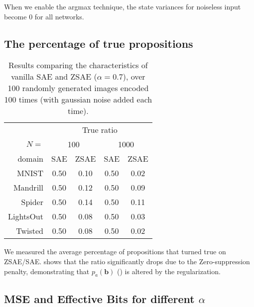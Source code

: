 \documentclass[10pt,letterpaper]{article}
\begin{document}
When we enable the argmax technique, the state variances for noiseless input become 0 for all networks.

\subsection{The percentage of true propositions}

\begin{table}[htbp]
 \centering
 \setlength{\tabcolsep}{0.45em}
 \begin{tabular}{|r|*{4}{c|}}
       & \multicolumn{4}{c|}{True ratio} \\
$N=$ & \multicolumn{2}{c|}{100} & \multicolumn{2}{c|}{1000} \\
domain    & SAE  & ZSAE & SAE  & ZSAE \\ 
MNIST     & 0.50 & 0.10 & 0.50 & 0.02 \\ 
Mandrill  & 0.50 & 0.12 & 0.50 & 0.09 \\ 
Spider    & 0.50 & 0.14 & 0.50 & 0.11 \\ 
LightsOut & 0.50 & 0.08 & 0.50 & 0.03 \\ 
Twisted   & 0.50 & 0.08 & 0.50 & 0.02 \\ 
\end{tabular}
 \caption{Results comparing the characteristics of vanilla SAE and ZSAE ($\alpha=0.7$),
 over 100 randomly generated images encoded 100 times (with gaussian noise added each time).
 }
\label{tab:trueratio}
\end{table}

We measured the average percentage of propositions that turned true on ZSAE/SAE.
 shows that the ratio significantly drops due to the Zero-suppression penalty,
demonstrating that $p_a(\mathbf{b})$ () is altered by the regularization.

\subsection{MSE and Effective Bits for different $\alpha$}
\label{more-sensitivity}
\end{document}
